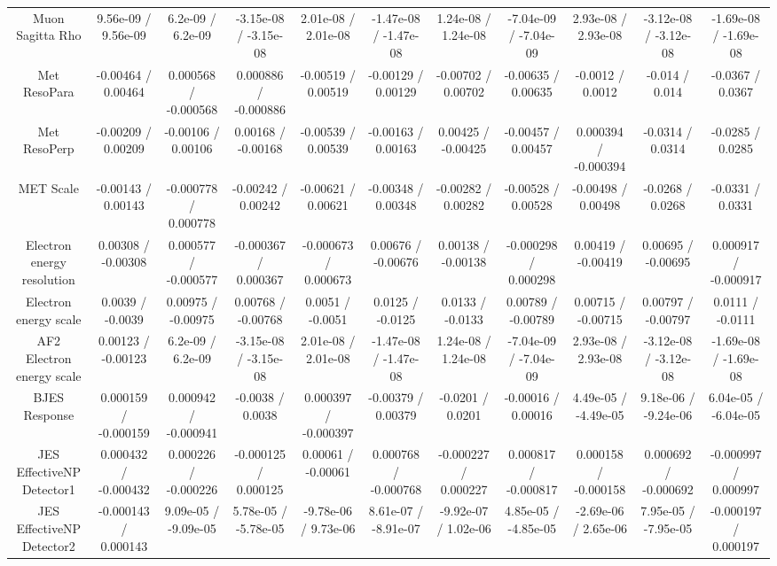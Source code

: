 \begin{table}[htbp]
\begin{center}
\begin{tabular}{|c|c|c|c|c|c|c|c|c|c|c|}
  Muon Sagitta Rho & 9.56e-09 / 9.56e-09 & 6.2e-09 / 6.2e-09 & -3.15e-08 / -3.15e-08 & 2.01e-08 / 2.01e-08 & -1.47e-08 / -1.47e-08 & 1.24e-08 / 1.24e-08 & -7.04e-09 / -7.04e-09 & 2.93e-08 / 2.93e-08 & -3.12e-08 / -3.12e-08 & -1.69e-08 / -1.69e-08 \\ 
  Met ResoPara & -0.00464 / 0.00464 & 0.000568 / -0.000568 & 0.000886 / -0.000886 & -0.00519 / 0.00519 & -0.00129 / 0.00129 & -0.00702 / 0.00702 & -0.00635 / 0.00635 & -0.0012 / 0.0012 & -0.014 / 0.014 & -0.0367 / 0.0367 \\ 
  Met ResoPerp & -0.00209 / 0.00209 & -0.00106 / 0.00106 & 0.00168 / -0.00168 & -0.00539 / 0.00539 & -0.00163 / 0.00163 & 0.00425 / -0.00425 & -0.00457 / 0.00457 & 0.000394 / -0.000394 & -0.0314 / 0.0314 & -0.0285 / 0.0285 \\ 
  MET Scale & -0.00143 / 0.00143 & -0.000778 / 0.000778 & -0.00242 / 0.00242 & -0.00621 / 0.00621 & -0.00348 / 0.00348 & -0.00282 / 0.00282 & -0.00528 / 0.00528 & -0.00498 / 0.00498 & -0.0268 / 0.0268 & -0.0331 / 0.0331 \\ 
  Electron energy resolution & 0.00308 / -0.00308 & 0.000577 / -0.000577 & -0.000367 / 0.000367 & -0.000673 / 0.000673 & 0.00676 / -0.00676 & 0.00138 / -0.00138 & -0.000298 / 0.000298 & 0.00419 / -0.00419 & 0.00695 / -0.00695 & 0.000917 / -0.000917 \\ 
  Electron energy scale & 0.0039 / -0.0039 & 0.00975 / -0.00975 & 0.00768 / -0.00768 & 0.0051 / -0.0051 & 0.0125 / -0.0125 & 0.0133 / -0.0133 & 0.00789 / -0.00789 & 0.00715 / -0.00715 & 0.00797 / -0.00797 & 0.0111 / -0.0111 \\ 
  AF2 Electron energy scale & 0.00123 / -0.00123 & 6.2e-09 / 6.2e-09 & -3.15e-08 / -3.15e-08 & 2.01e-08 / 2.01e-08 & -1.47e-08 / -1.47e-08 & 1.24e-08 / 1.24e-08 & -7.04e-09 / -7.04e-09 & 2.93e-08 / 2.93e-08 & -3.12e-08 / -3.12e-08 & -1.69e-08 / -1.69e-08 \\ 
  BJES Response & 0.000159 / -0.000159 & 0.000942 / -0.000941 & -0.0038 / 0.0038 & 0.000397 / -0.000397 & -0.00379 / 0.00379 & -0.0201 / 0.0201 & -0.00016 / 0.00016 & 4.49e-05 / -4.49e-05 & 9.18e-06 / -9.24e-06 & 6.04e-05 / -6.04e-05 \\ 
  JES EffectiveNP Detector1 & 0.000432 / -0.000432 & 0.000226 / -0.000226 & -0.000125 / 0.000125 & 0.00061 / -0.00061 & 0.000768 / -0.000768 & -0.000227 / 0.000227 & 0.000817 / -0.000817 & 0.000158 / -0.000158 & 0.000692 / -0.000692 & -0.000997 / 0.000997 \\ 
  JES EffectiveNP Detector2 & -0.000143 / 0.000143 & 9.09e-05 / -9.09e-05 & 5.78e-05 / -5.78e-05 & -9.78e-06 / 9.73e-06 & 8.61e-07 / -8.91e-07 & -9.92e-07 / 1.02e-06 & 4.85e-05 / -4.85e-05 & -2.69e-06 / 2.65e-06 & 7.95e-05 / -7.95e-05 & -0.000197 / 0.000197 \\ 

\end{tabular}
\end{center}
\end{table}
